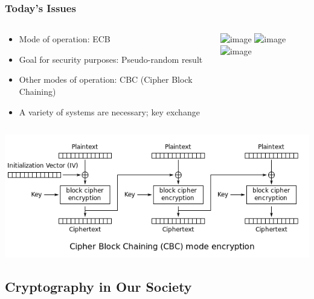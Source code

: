 \documentclass[12pt]{beamer}
\begin{document}
\begin{frame}
\frametitle{Today's Issues}

\begin{columns}
\begin{column}{0.5\textwidth}
\begin{itemize}
\item<1-> Mode of operation: ECB
\item<3-> Goal for security purposes: Pseudo-random result
\item<4-> Other modes of operation: CBC (Cipher Block Chaining)
\item<4-> A variety of systems are necessary; key exchange
\end{itemize}
\end{column}
\begin{column}{0.5\textwidth}
\includegraphics<1>[scale=0.7]{tux.jpg}
\includegraphics<2>[scale=0.7]{tux_ecb.jpg}
\includegraphics<3->[scale=0.7]{tux_secure.jpg}
\end{column}
\end{columns}
\end{frame}

\begin{frame}
\begin{center}
\includegraphics[scale=0.5]{CBC.PNG}
\end{center}
\end{frame}

\subsection{Cryptography in Our Society}
\end{document}
